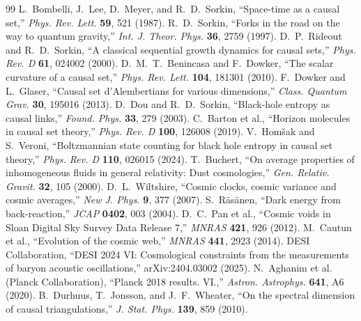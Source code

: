 \documentclass[11pt]{article}
\begin{document}
\begin{thebibliography}{99}
 L.~Bombelli, J.~Lee, D.~Meyer, and R.~D.~Sorkin, ``Space-time as a causal set,'' \emph{Phys. Rev. Lett.} \textbf{59}, 521 (1987).
 R.~D.~Sorkin, ``Forks in the road on the way to quantum gravity,'' \emph{Int. J. Theor. Phys.} \textbf{36}, 2759 (1997).
 D.~P.~Rideout and R.~D.~Sorkin, ``A classical sequential growth dynamics for causal sets,'' \emph{Phys. Rev. D} \textbf{61}, 024002 (2000).
 D.~M.~T.~Benincasa and F.~Dowker, ``The scalar curvature of a causal set,'' \emph{Phys. Rev. Lett.} \textbf{104}, 181301 (2010).
 F.~Dowker and L.~Glaser, ``Causal set d'Alembertians for various dimensions,'' \emph{Class. Quantum Grav.} \textbf{30}, 195016 (2013).
 D.~Dou and R.~D.~Sorkin, ``Black-hole entropy as causal links,'' \emph{Found. Phys.} \textbf{33}, 279 (2003).
 C.~Barton et al., ``Horizon molecules in causal set theory,'' \emph{Phys. Rev. D} \textbf{100}, 126008 (2019).
 V.~Hom\v{s}ak and S.~Veroni, ``Boltzmannian state counting for black hole entropy in causal set theory,'' \emph{Phys. Rev. D} \textbf{110}, 026015 (2024).
 T.~Buchert, ``On average properties of inhomogeneous fluids in general relativity: Dust cosmologies,'' \emph{Gen. Relativ. Gravit.} \textbf{32}, 105 (2000).
 D.~L.~Wiltshire, ``Cosmic clocks, cosmic variance and cosmic averages,'' \emph{New J. Phys.} \textbf{9}, 377 (2007).
 S.~R\"as\"anen, ``Dark energy from back-reaction,'' \emph{JCAP} \textbf{0402}, 003 (2004).
 D.~C.~Pan et al., ``Cosmic voids in Sloan Digital Sky Survey Data Release 7,'' \emph{MNRAS} \textbf{421}, 926 (2012).
 M.~Cautun et al., ``Evolution of the cosmic web,'' \emph{MNRAS} \textbf{441}, 2923 (2014).
 DESI Collaboration, ``DESI 2024 VI: Cosmological constraints from the measurements of baryon acoustic oscillations,'' arXiv:2404.03002 (2025).
 N.~Aghanim et al. (Planck Collaboration), ``Planck 2018 results. VI.,'' \emph{Astron. Astrophys.} \textbf{641}, A6 (2020).
 B.~Durhuus, T.~Jonsson, and J.~F.~Wheater, ``On the spectral dimension of causal triangulations,'' \emph{J. Stat. Phys.} \textbf{139}, 859 (2010).
\end{thebibliography}
\end{document}
